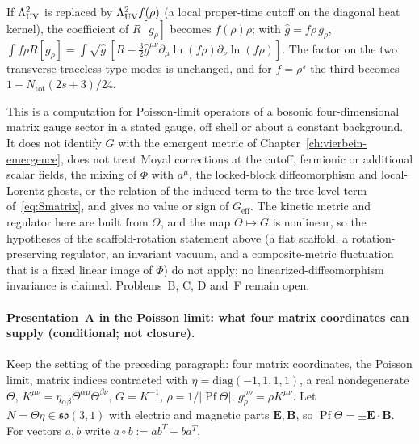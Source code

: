If \(\Lambda_{\mathrm{UV}}^2\) is replaced by \(\Lambda_{\mathrm{UV}}^2f(\rho)\) (a local proper-time
cutoff on the diagonal heat kernel), the coefficient of
\(R[g_\rho]\) becomes \(f(\rho)\rho\); with
\(\hat g=f\rho\,g_\rho\),
\(\int f\rho R[g_\rho]=\int\sqrt{\hat g}\,[\hat R
-\tfrac32\hat g^{\mu\nu}\partial_\mu\ln(f\rho)\partial_\nu\ln(f\rho)]\).
The factor on the two transverse-traceless-type modes is unchanged, and
for \(f=\rho^s\) the third becomes \(1-N_{\mathrm{tot}}(2s+3)/24\).

This is a computation for Poisson-limit operators of a bosonic
four-dimensional matrix gauge sector in a stated gauge, off shell or
about a constant background. It does not identify \(G\) with the
emergent metric of Chapter~\ref{ch:vierbein-emergence}, does not
treat Moyal corrections at the cutoff, fermionic or additional scalar
fields, the mixing of \(\Phi\) with \(a^\mu\), the locked-block
diffeomorphism and local-Lorentz ghosts, or the relation of the induced
term to the tree-level term of~\eqref{eq:Smatrix}, and gives no value or
sign of \(G_{\mathrm{eff}}\). The kinetic metric and regulator here
are built from \(\Theta\), and the map \(\Theta\mapsto G\) is nonlinear,
so the hypotheses of the scaffold-rotation statement above (a flat
scaffold, a rotation-preserving regulator, an invariant vacuum, and a
composite-metric fluctuation that is a fixed linear image of \(\Phi\))
do not apply; no linearized-diffeomorphism invariance is claimed.
Problems~B, C, D and~F remain open.

\paragraph{Presentation~A in the Poisson limit: what four matrix coordinates can supply (conditional; not closure).}
Keep the setting of the preceding paragraph: four matrix coordinates, the Poisson limit, matrix indices contracted with \(\eta=\mathrm{diag}(-1,1,1,1)\), a real nondegenerate \(\Theta\), \(K^{\mu\nu}=\eta_{\alpha\beta}\Theta^{\alpha\mu}\Theta^{\beta\nu}\), \(G=K^{-1}\), \(\rho=1/|\operatorname{Pf}\Theta|\), \(g_\rho^{\mu\nu}=\rho K^{\mu\nu}\). Let \(N=\Theta\eta\in\mathfrak{so}(3,1)\) with electric and magnetic parts \(\mathbf E,\mathbf B\), so \(\operatorname{Pf}\Theta=\pm\mathbf E\cdot\mathbf B\). For vectors \(a,b\) write \(a\circ b:=ab^T+ba^T\).

